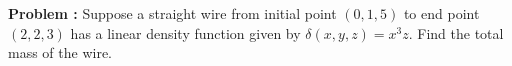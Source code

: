 {\bf Problem :} Suppose a straight wire from initial point \((0,1,5)\) to end point \((2,2,3)\) has a linear density function given by $\delta(x,y,z) = x^3 z$. Find the total mass of the wire.
